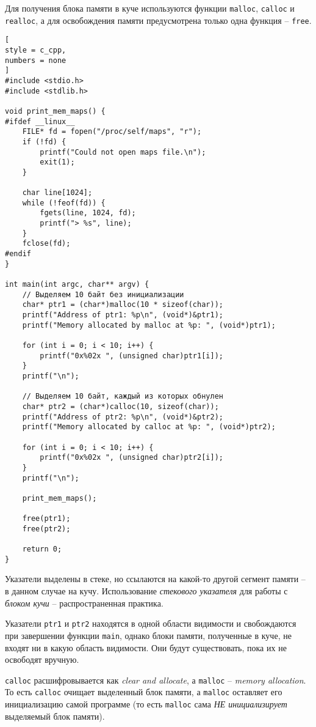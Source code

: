 \documentclass[%
	11pt,
	a4paper,
	utf8,
		]{article}
\begin{document}
Для получения блока памяти в куче используются функции \verb|malloc|, \verb|calloc| и \verb|realloc|, а для освобождения памяти предусмотрена только одна функция -- \verb|free|.

\begin{lstlisting}[
style = c_cpp,
numbers = none
]
#include <stdio.h>
#include <stdlib.h>

void print_mem_maps() {
#ifdef __linux__
    FILE* fd = fopen("/proc/self/maps", "r");
    if (!fd) {
        printf("Could not open maps file.\n");
        exit(1);
    }
    
    char line[1024];
    while (!feof(fd)) {
        fgets(line, 1024, fd);
        printf("> %s", line);
    }
    fclose(fd);
#endif
}

int main(int argc, char** argv) {
    // Выделяем 10 байт без инициализации
    char* ptr1 = (char*)malloc(10 * sizeof(char));
    printf("Address of ptr1: %p\n", (void*)&ptr1);
    printf("Memory allocated by malloc at %p: ", (void*)ptr1);
    
    for (int i = 0; i < 10; i++) {
        printf("0x%02x ", (unsigned char)ptr1[i]);
    }
    printf("\n");
    
    // Выделяем 10 байт, каждый из которых обнулен
    char* ptr2 = (char*)calloc(10, sizeof(char));
    printf("Address of ptr2: %p\n", (void*)&ptr2);
    printf("Memory allocated by calloc at %p: ", (void*)ptr2);
    
    for (int i = 0; i < 10; i++) {
        printf("0x%02x ", (unsigned char)ptr2[i]);
    }
    printf("\n");
    
    print_mem_maps();
    
    free(ptr1);
    free(ptr2);
    
    return 0;
}
\end{lstlisting}

Указатели выделены в стеке, но ссылаются на какой-то другой сегмент памяти -- в данном случае на кучу. Использование \emph{стекового указателя} для работы с \emph{блоком кучи} -- распространенная практика.

Указатели \verb|ptr1| и \verb*|ptr2| находятся в одной области видимости и свобождаются при завершении функции \verb|main|, однако блоки памяти, полученные в куче, не входят ни в какую область видимости. Они будут существовать, пока их не освободят вручную.

\verb|calloc| расшифровывается как \emph{clear and allocate}, а \verb|malloc| -- \emph{memory allocation}. То есть \verb|calloc| очищает выделенный блок памяти, а \verb|malloc| оставляет его инициализацию самой программе (то есть \verb|malloc| сама \emph{НЕ инициализирует} выделяемый блок памяти).
\end{document}
